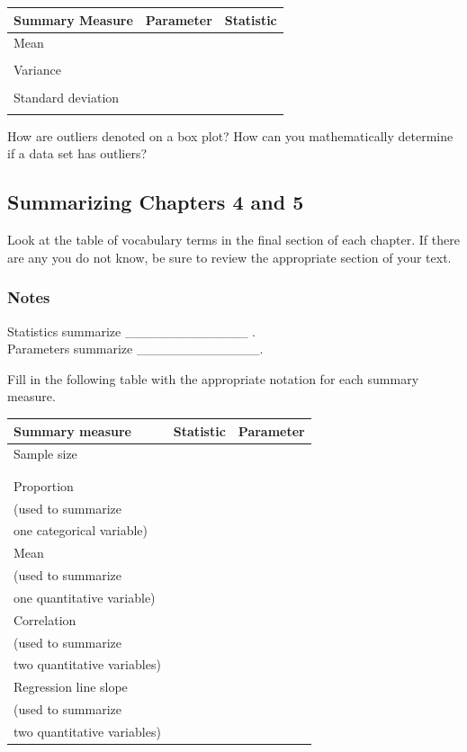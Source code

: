 \documentclass[
]{report}
\newcommand{\rgs}{\vspace{12pt}} %
\begin{document}
\begin{center}
\begin{tabular}{|l|p{2in}|p{2in}|} \hline
Summary Measure & Parameter & Statistic \\ \hline
Mean & & \\ 
& & \\ \hline
Variance & & \\ 
& & \\ \hline
Standard deviation & & \\ 
& & \\ \hline
\end{tabular}
\end{center}

How are outliers denoted on a box plot? How can you mathematically determine if a data set has outliers?
\rgs

\hypertarget{summarizing-chapters-4-and-5}{%
\subsection{Summarizing Chapters 4 and 5}\label{summarizing-chapters-4-and-5}}

Look at the table of vocabulary terms in the final section of each chapter. If there are any you do not know, be sure to review the appropriate section of your text.

\hypertarget{notes-6}{%
\subsubsection*{Notes}\label{notes-6}}

Statistics summarize \_\_\_\_\_\_\_\_\_\_\_\_\_ .\\
Parameters summarize \_\_\_\_\_\_\_\_\_\_\_\_\_.

Fill in the following table with the appropriate notation for each summary measure.

\begin{center}
\begin{tabular}{|l|p{2in}|p{2in}|}\hline
Summary measure & Statistic & Parameter \\ \hline
Sample size & & \\ 
& & \\ 
& & \\ \hline
Proportion & & \\ 
(used to summarize & & \\ 
one categorical variable) & & \\ \hline
Mean & & \\ 
(used to summarize & & \\ 
one quantitative variable)& & \\ \hline
Correlation & & \\ 
(used to summarize & & \\ 
two quantitative variables)& & \\ \hline
Regression line slope & & \\ 
(used to summarize & & \\ 
two quantitative variables)& & \\ \hline
\end{tabular}
\end{center}
\end{document}
